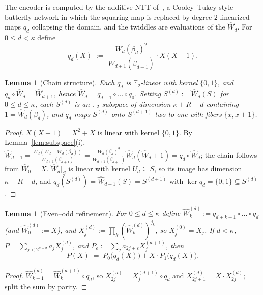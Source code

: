 \documentclass[11pt]{article}
\newcommand{\Ftwo}{\mathbb{F}_2}
\newcommand{\Wn}[1]{\widehat{W}_{#1}}   %
\theoremstyle{plain}
\newtheorem{lemma}[theorem]{Lemma}
\theoremstyle{definition}
\theoremstyle{remark}
\begin{document}
The encoder is computed by the additive NTT of~\cite{LCH14}, a Cooley--Tukey-style butterfly network in which the squaring map is replaced by degree-$2$ linearized maps $q_d$ collapsing the domain, and the twiddles are evaluations of the $\Wn{d}$. For $0 \le d < \kappa$ define
\[
q_d(X) \;:=\; \frac{W_d(\beta_d)^2}{W_{d+1}(\beta_{d+1})} \cdot X(X+1).
\]

\begin{lemma}[Chain structure]\label{lem:chain}
Each $q_d$ is $\Ftwo$-linear with kernel $\{0,1\}$, and $q_d \circ \Wn{d} = \Wn{d+1}$, hence $\Wn{d} = q_{d-1} \circ \dots \circ q_0$. Setting $S^{(d)} := \Wn{d}(S)$ for $0 \le d \le \kappa$, each $S^{(d)}$ is an $\Ftwo$-subspace of dimension $\kappa + R - d$ containing $1 = \Wn{d}(\beta_d)$, and $q_d$ maps $S^{(d)}$ onto $S^{(d+1)}$ two-to-one with fibers $\{x, x+1\}$.
\end{lemma}

\begin{proof}
$X(X+1) = X^2 + X$ is linear with kernel $\{0,1\}$. By Lemma~\ref{lem:subspace}(i), $\Wn{d+1} = \tfrac{W_d (W_d + W_d(\beta_d))}{W_{d+1}(\beta_{d+1})} = \tfrac{W_d(\beta_d)^2}{W_{d+1}(\beta_{d+1})} \Wn{d}(\Wn{d} + 1) = q_d \circ \Wn{d}$; the chain follows from $\Wn{0} = X$. $\Wn{d}|_S$ is linear with kernel $U_d \subseteq S$, so its image has dimension $\kappa + R - d$, and $q_d(S^{(d)}) = \Wn{d+1}(S) = S^{(d+1)}$ with $\ker q_d = \{0,1\} \subseteq S^{(d)}$.
\end{proof}

\begin{lemma}[Even--odd refinement]\label{lem:evenodd}
For $0 \le d \le \kappa$ define $\Wn{k}^{(d)} := q_{d+k-1} \circ \dots \circ q_d$ (and $\Wn{0}^{(d)} := X$), and $X^{(d)}_j := \prod_k (\Wn{k}^{(d)})^{j_k}$, so $X^{(0)}_j = X_j$. If $d < \kappa$, $P = \sum_{j < 2^{\kappa-d}} a_j X^{(d)}_j$, and $P_\varepsilon := \sum_j a_{2j+\varepsilon} X^{(d+1)}_j$, then
\[
P(X) \;=\; P_0\bigl(q_d(X)\bigr) + X \cdot P_1\bigl(q_d(X)\bigr).
\]
\end{lemma}

\begin{proof}
$\Wn{k+1}^{(d)} = \Wn{k}^{(d+1)} \circ q_d$, so $X^{(d)}_{2j} = X^{(d+1)}_j \circ q_d$ and $X^{(d)}_{2j+1} = X \cdot X^{(d)}_{2j}$; split the sum by parity.
\end{proof}
\end{document}
